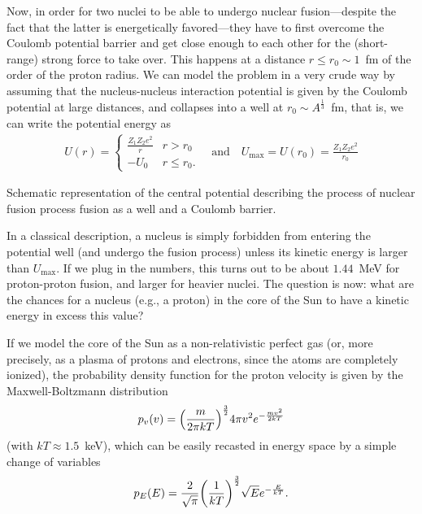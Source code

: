 Now, in order for two nuclei to be able to undergo nuclear fusion---despite the
fact that the latter is energetically favored---they have to first overcome the
Coulomb potential barrier and get close enough to each other for the (short-range)
strong force to take over. This happens at a distance $r \leq r_0 \sim 1$~fm
of the order of the proton radius. We can model the problem in a very crude way
by assuming that the nucleus-nucleus interaction potential is given by the Coulomb
potential at large distances, and collapses into a well at $r_0 \sim A^\frac{1}{3}$~fm,
that is, we can write the potential energy as
\begin{align*}
  U(r) =
  \begin{cases}
    \displaystyle\frac{Z_1 Z_2 e^2}{r} & r > r_0\\
    -U_0 & r \leq r_0.
  \end{cases}
  \quad\text{and}\quad
  U_\text{max} = U(r_0) = \frac{Z_1 Z_2 e^2}{r_0}
\end{align*}

\begin{marginfigure}
  
  \caption{Schematic representation of the central potential describing the process
  of nuclear fusion process fusion as a well and a Coulomb barrier.}
  \label{fig:pp_fusion}
\end{marginfigure}

In a classical description, a nucleus is simply forbidden from entering the potential
well (and undergo the fusion process) unless its kinetic energy is larger than $U_\text{max}$.
If we plug in the numbers, this turns out to be about $1.44$~MeV for proton-proton
fusion, and larger for heavier nuclei. The question is now: what are the chances
for a nucleus (e.g., a proton) in the core of the Sun to have a kinetic energy in
excess this value?

If we model the core of the Sun as a non-relativistic perfect gas (or, more
precisely, as a plasma of protons and electrons, since the atoms are completely
ionized), the probability density function for the proton velocity is given by the
Maxwell-Boltzmann distribution
\begin{align}
  p_v(v) = \qty(\frac{m}{2\pi kT})^\frac{3}{2} 4\pi v^2 e^{-\frac{mv^2}{2kT}}
\end{align}
(with $kT \approx 1.5$~keV), which can be easily recasted in energy space by a simple
change of variables
\begin{align}\label{eq:maxwell_boltzmann_dist_energy}
  p_E(E) = \frac{2}{\sqrt{\pi}} \qty(\frac{1}{kT})^\frac{3}{2} \sqrt{E} e^{-\frac{E}{kT}}.
\end{align}

